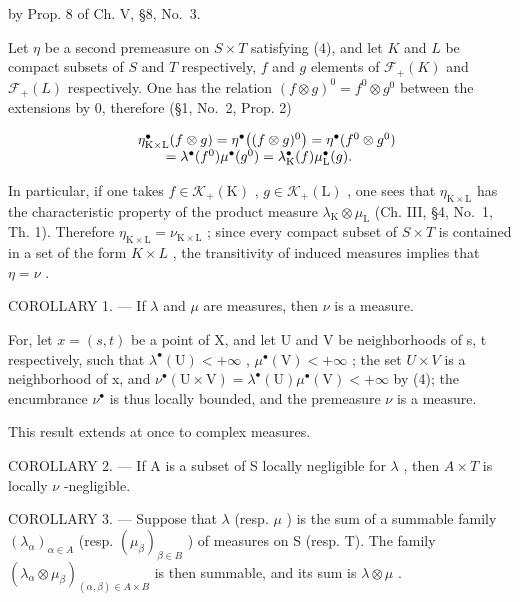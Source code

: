 by Prop. 8 of Ch. V, §8, No.~3.

Let \(\eta\) be a second premeasure on \(S \times T\) satisfying (4), and let \(K\) and \(L\) be compact subsets of \(S\) and \(T\) respectively, \(f\) and \(g\) elements of \(\mathcal{F}_{+}(K)\) and \(\mathcal{F}_{+}(L)\) respectively. One has the relation \((f \otimes g)^{0} = f^{0} \otimes g^{0}\) between the extensions by 0, therefore (§1, No.~2, Prop. 2)

\[
\begin{array}{r l} & {\eta_ {\mathrm{K} \times \mathrm{L}} ^ {\bullet} (f \otimes g) = \eta^ {\bullet} \big ((f \otimes g) ^ {0} \big) = \eta^ {\bullet} (f ^ {0} \otimes g ^ {0})} \\ & {\qquad = \lambda^ {\bullet} (f ^ {0}) \mu^ {\bullet} (g ^ {0}) = \lambda_ {\mathrm{K}} ^ {\bullet} (f) \mu_ {\mathrm{L}} ^ {\bullet} (g).} \end{array}
\]

In particular, if one takes \(f \in \mathcal{K}_{+}(\mathrm{K})\) , \(g \in \mathcal{K}_{+}(\mathrm{L})\) , one sees that \(\eta_{\mathrm{K} \times \mathrm{L}}\) has the characteristic property of the product measure \(\lambda_{\mathrm{K}} \otimes \mu_{\mathrm{L}}\) (Ch. III, §4, No.~1, Th. 1). Therefore \(\eta_{\mathrm{K} \times \mathrm{L}} = \nu_{\mathrm{K} \times \mathrm{L}}\) ; since every compact subset of \(S \times T\) is contained in a set of the form \(K \times L\) , the transitivity of induced measures implies that \(\eta = \nu\) .

COROLLARY 1. --- If \(\lambda\) and \(\mu\) are measures, then \(\nu\) is a measure.

For, let \(x = (s, t)\) be a point of X, and let U and V be neighborhoods of s, t respectively, such that \(\lambda^{\bullet}(\mathrm{U}) < +\infty\) , \(\mu^{\bullet}(\mathrm{V}) < +\infty\) ; the set \(U \times V\) is a neighborhood of x, and \(\nu^{\bullet}(\mathrm{U} \times \mathrm{V}) = \lambda^{\bullet}(\mathrm{U}) \mu^{\bullet}(\mathrm{V}) < +\infty\) by (4); the encumbrance \(\nu^{\bullet}\) is thus locally bounded, and the premeasure \(\nu\) is a measure.

This result extends at once to complex measures.

COROLLARY 2. --- If A is a subset of S locally negligible for \(\lambda\) , then \(A \times T\) is locally \(\nu\) -negligible.

COROLLARY 3. --- Suppose that \(\lambda\) (resp. \(\mu\) ) is the sum of a summable family \((\lambda_{\alpha})_{\alpha \in A}\) (resp. \((\mu_{\beta})_{\beta \in B}\) ) of measures on S (resp. T). The family \((\lambda_{\alpha} \otimes \mu_{\beta})_{(\alpha, \beta) \in A \times B}\) is then summable, and its sum is \(\lambda \otimes \mu\) .


